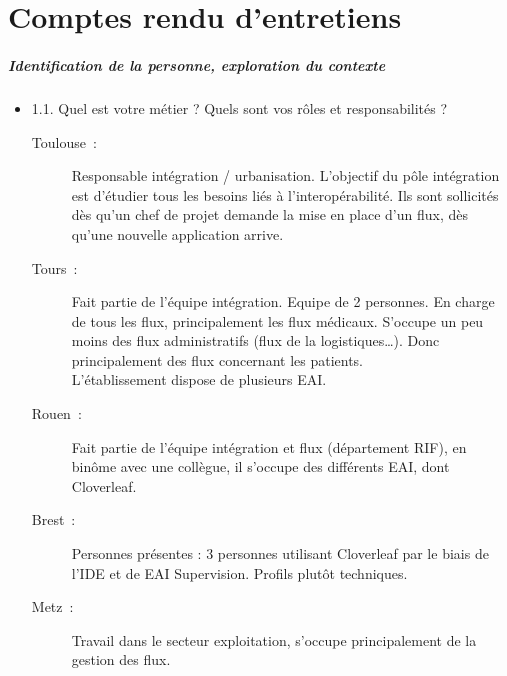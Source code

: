 \tocless\chapter{Comptes rendu d'entretiens}
\paragraph{Identification de la personne, exploration du contexte}
	\begin{itemize}
	  \item 1.1. Quel est votre métier ? Quels sont vos rôles et responsabilités ?
	  \begin{description}
	  	\item[Toulouse~:] Responsable intégration / urbanisation. L’objectif du pôle
	  	intégration est d’étudier tous les besoins liés à l’interopérabilité. Ils
	  	sont sollicités dès qu’un chef de projet demande la mise en place d’un
	  	flux, dès qu’une nouvelle application arrive.
	  	\item[Tours~:] Fait partie de l’équipe intégration. Equipe de 2 personnes.
	  	En charge de tous les flux, principalement les flux médicaux. S’occupe un
	  	peu moins des flux administratifs (flux de la logistiques…). Donc
	  	principalement des flux concernant les patients.\\
		L’établissement dispose de plusieurs EAI.
	  	\item[Rouen~:] Fait partie de l’équipe intégration et flux (département RIF),
	  	en binôme avec une collègue, il s’occupe des différents EAI, dont Cloverleaf.
	  	\item[Brest~:] Personnes présentes : 3 personnes utilisant Cloverleaf par le
	  	biais de l’IDE et de EAI Supervision. Profils plutôt techniques.
	  	\item[Metz~:] Travail dans le secteur exploitation, s’occupe principalement
	  	de la gestion des flux.
	  \end{description}
	  

\end{itemize}

